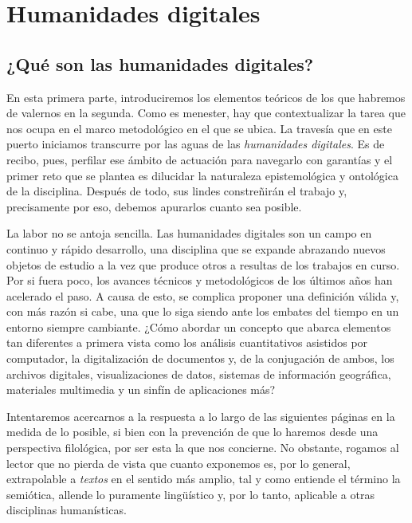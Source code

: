 \chapter{Humanidades digitales}
\section{¿Qué son las humanidades digitales?}
En esta primera parte, introduciremos los elementos teóricos de los que habremos de valernos en la segunda. Como es menester, hay que contextualizar la tarea que nos ocupa en el marco metodológico en el que se ubica. La travesía que en este puerto iniciamos transcurre por las aguas de las \textit{humanidades digitales}. Es de recibo, pues, perfilar ese ámbito de actuación para navegarlo con garantías y el primer reto que se plantea es dilucidar la naturaleza epistemológica y ontológica de la disciplina. Después de todo, sus lindes constreñirán el trabajo y, precisamente por eso, debemos apurarlos cuanto sea posible.

La labor no se antoja sencilla. Las humanidades digitales son un campo en continuo y rápido desarrollo, una disciplina que se expande abrazando nuevos objetos de estudio a la vez que produce otros a resultas de los trabajos en curso. Por si fuera poco, los avances técnicos y metodológicos de los últimos años han acelerado el paso. A causa de esto, se complica proponer una definición válida y, con más razón si cabe, una que lo siga siendo ante los embates del tiempo en un entorno siempre cambiante. ¿Cómo abordar un concepto que abarca elementos tan diferentes a primera vista como los análisis cuantitativos asistidos por computador, la digitalización de documentos y, de la conjugación de ambos, los archivos digitales, visualizaciones de datos, sistemas de información geográfica, materiales multimedia y un sinfín de aplicaciones más? 

Intentaremos acercarnos a la respuesta a lo largo de las siguientes páginas en la medida de lo posible, si bien con la prevención de que lo haremos desde una perspectiva filológica, por ser esta la que nos concierne. No obstante, rogamos al lector que no pierda de vista que cuanto exponemos es, por lo general, extrapolable a \textit{textos} en el sentido más amplio, tal y como entiende el término la semiótica, allende lo puramente lingüístico y, por lo tanto, aplicable a otras disciplinas humanísticas.

